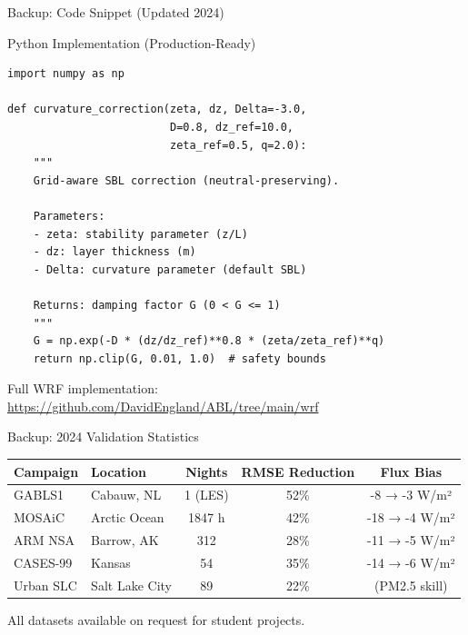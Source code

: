 \documentclass[10pt,aspectratio=169]{beamer}
\begin{document}
\begin{frame}[fragile]{Backup: Code Snippet (Updated 2024)}
  \begin{block}{Python Implementation (Production-Ready)}
\begin{verbatim}
import numpy as np

def curvature_correction(zeta, dz, Delta=-3.0, 
                         D=0.8, dz_ref=10.0, 
                         zeta_ref=0.5, q=2.0):
    """
    Grid-aware SBL correction (neutral-preserving).
    
    Parameters:
    - zeta: stability parameter (z/L)
    - dz: layer thickness (m)
    - Delta: curvature parameter (default SBL)
    
    Returns: damping factor G (0 < G <= 1)
    """
    G = np.exp(-D * (dz/dz_ref)**0.8 * (zeta/zeta_ref)**q)
    return np.clip(G, 0.01, 1.0)  # safety bounds
\end{verbatim}
  \end{block}
  
  Full WRF implementation: \url{https://github.com/DavidEngland/ABL/tree/main/wrf}
\end{frame}

\begin{frame}{Backup: 2024 Validation Statistics}
  \begin{table}
    \centering
    \footnotesize
    \begin{tabular}{llccc}
      \toprule
      \textbf{Campaign} & \textbf{Location} & \textbf{Nights} & \textbf{RMSE Reduction} & \textbf{Flux Bias} \\
      \midrule
      GABLS1 & Cabauw, NL & 1 (LES) & 52\% & -8 → -3 W/m² \\
      MOSAiC & Arctic Ocean & 1847 h & 42\% & -18 → -4 W/m² \\
      ARM NSA & Barrow, AK & 312 & 28\% & -11 → -5 W/m² \\
      CASES-99 & Kansas & 54 & 35\% & -14 → -6 W/m² \\
      Urban SLC & Salt Lake City & 89 & 22\% & (PM2.5 skill) \\
      \bottomrule
    \end{tabular}
  \end{table}
  
  \vspace{0.3cm}
  All datasets available on request for student projects.
\end{frame}
\end{document}
